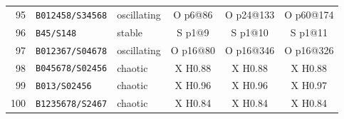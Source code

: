 {\begin{longtable}{@{}rllccc@{}}
95 & \texttt{B012458/S34568} & oscillating & O p6@86 & O p24@133 & O p60@174 \\
96 & \texttt{B45/S148} & stable & S p1@9 & S p1@10 & S p1@11 \\
97 & \texttt{B012367/S04678} & oscillating & O p16@80 & O p16@346 & O p16@326 \\
98 & \texttt{B045678/S02456} & chaotic & X H0.88 & X H0.88 & X H0.88 \\
99 & \texttt{B013/S02456} & chaotic & X H0.96 & X H0.96 & X H0.97 \\
100 & \texttt{B1235678/S2467} & chaotic & X H0.84 & X H0.84 & X H0.84 \\
\bottomrule
\end{longtable}
}
